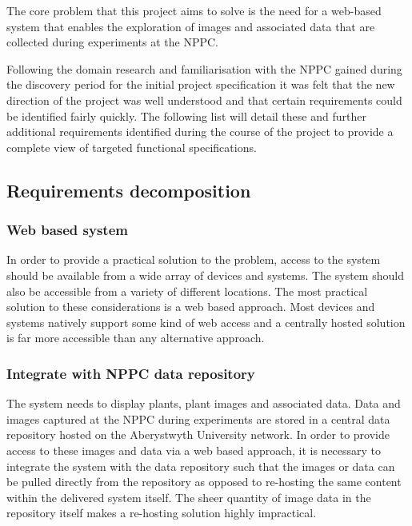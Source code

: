 
The core problem that this project aims to solve is the need for a web-based system that enables the exploration of images and associated data that are collected during experiments at the NPPC. 


 Following the domain research and familiarisation with the NPPC gained during the discovery period for the initial project specification it was felt that the new direction of the project was well understood and that certain requirements could be identified fairly quickly. The following list will detail these and further additional requirements identified during the course of the project to provide a complete view of targeted functional specifications.


\subsection{Requirements decomposition}\label{req}


\subsubsection{Web based system} In order to provide a practical solution to the problem, access to the system should be available from a wide array of devices and systems. The system should also be accessible from a variety of different locations. The most practical solution to these considerations is a web based approach. Most devices and systems natively support some kind of web access and a centrally hosted solution is far more accessible than any alternative approach.


\subsubsection{Integrate with NPPC data repository} The system needs to display plants, plant images and associated data. Data and images captured at the NPPC during experiments are stored in a central data repository hosted on the Aberystwyth University network. In order to provide access to these images and data via a web based approach, it is necessary to integrate the system with the data repository such that the images or data can be pulled directly from the repository as opposed to re-hosting the same content within the delivered system itself. The sheer quantity of image data in the repository itself makes a re-hosting solution highly impractical. 

